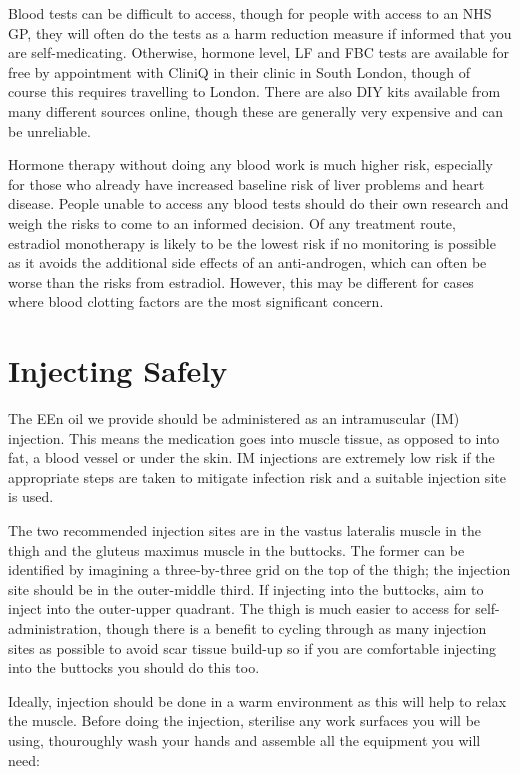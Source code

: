 \documentclass[twoside,a5paper]{article}
\begin{document}
Blood tests can be difficult to access, though for people with access
to an NHS GP, they will often do the tests as a harm reduction measure
if informed that you are self-medicating.  Otherwise, hormone level,
LF and FBC tests are available for free by appointment with CliniQ in
their clinic in South London, though of course this requires
travelling to London.  There are also DIY kits available from many
different sources online, though these are generally very expensive
and can be unreliable.

Hormone therapy without doing any blood work is much higher risk,
especially for those who already have increased baseline risk of liver
problems and heart disease.  People unable to access any blood tests
should do their own research and weigh the risks to come to an
informed decision.  Of any treatment route, estradiol monotherapy is
likely to be the lowest risk if no monitoring is possible as it avoids
the additional side effects of an anti-androgen, which can often be
worse than the risks from estradiol.  However, this may be different
for cases where blood clotting factors are the most significant
concern.

\section{Injecting Safely}

The EEn oil we provide should be administered as an intramuscular (IM)
injection.  This means the medication goes into muscle tissue, as
opposed to into fat, a blood vessel or under the skin.  IM injections
are extremely low risk if the appropriate steps are taken to mitigate
infection risk and a suitable injection site is used.

The two recommended injection sites are in the vastus lateralis muscle
in the thigh and the gluteus maximus muscle in the buttocks.  The
former can be identified by imagining a three-by-three grid on the top
of the thigh; the injection site should be in the outer-middle third.
If injecting into the buttocks, aim to inject into the outer-upper
quadrant.  The thigh is much easier to access for self-administration,
though there is a benefit to cycling through as many injection sites
as possible to avoid scar tissue build-up so if you are comfortable
injecting into the buttocks you should do this too.

Ideally, injection should be done in a warm environment as this will
help to relax the muscle.  Before doing the injection, sterilise any
work surfaces you will be using, thouroughly wash your hands and
assemble all the equipment you will need:
\end{document}
